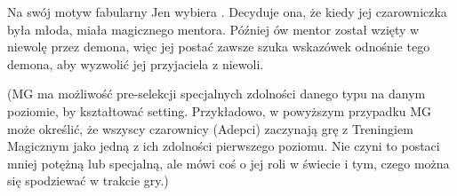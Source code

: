 Na swój motyw fabularny Jen wybiera . Decyduje ona, że kiedy jej czarowniczka była młoda, miała magicznego mentora. Później ów mentor został wzięty w niewolę przez demona, więc jej postać zawsze szuka wskazówek odnośnie tego demona, aby wyzwolić jej przyjaciela z niewoli.

(MG ma możliwość pre-selekcji specjalnych zdolności danego typu na danym poziomie, by kształtować setting. Przykładowo, w powyższym przypadku MG może określić, że wszyscy czarownicy (Adepci) zaczynają grę z Treningiem Magicznym jako jedną z ich zdolności pierwszego poziomu. Nie czyni to postaci mniej potężną lub specjalną, ale mówi coś o jej roli w świecie i tym, czego można się spodziewać w trakcie gry.)